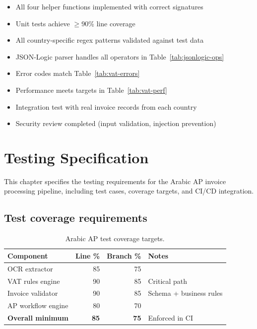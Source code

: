 \documentclass[11pt,a4paper,twoside]{report}
\begin{document}
\begin{itemize}
  \item[\texttt{[ ]}] All four helper functions implemented with correct signatures
  \item[\texttt{[ ]}] Unit tests achieve $\geq$90\% line coverage
  \item[\texttt{[ ]}] All country-specific regex patterns validated against test data
  \item[\texttt{[ ]}] JSON-Logic parser handles all operators in Table~\ref{tab:jsonlogic-ops}
  \item[\texttt{[ ]}] Error codes match Table~\ref{tab:vat-errors}
  \item[\texttt{[ ]}] Performance meets targets in Table~\ref{tab:vat-perf}
  \item[\texttt{[ ]}] Integration test with real invoice records from each country
  \item[\texttt{[ ]}] Security review completed (input validation, injection prevention)
\end{itemize}
\chapter{Testing Specification}\label{ch:testing}

This chapter specifies the testing requirements for the Arabic AP invoice
processing pipeline, including test cases, coverage targets, and CI/CD
integration.

\section{Test coverage requirements}

\begin{table}[htbp]
\centering
\caption{Arabic AP test coverage targets.}
\label{tab:arabic-coverage}
\footnotesize
\begin{tabularx}{\linewidth}{@{}l r r X@{}}
\toprule
\textbf{Component} & \textbf{Line \%} & \textbf{Branch \%} & \textbf{Notes} \\ \midrule
OCR extractor & 85 & 75 & \\
VAT rules engine & 90 & 85 & Critical path \\
Invoice validator & 90 & 85 & Schema + business rules \\
AP workflow engine & 80 & 70 & \\
\textbf{Overall minimum} & \textbf{85} & \textbf{75} & Enforced in CI \\
\bottomrule
\end{tabularx}
\end{table}
\end{document}
